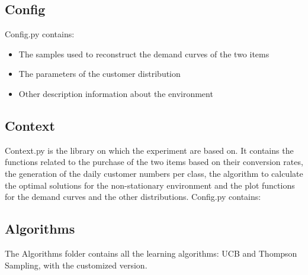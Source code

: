 \subsection*{Config}
Config.py contains:
\begin{itemize}
	\item The samples used to reconstruct the demand curves of the two items
	\item The parameters of the customer distribution
	\item Other description information about the environment
\end{itemize} 

\subsection*{Context}
Context.py is the library on which the experiment are based on. It contains the functions related to the purchase of the two items based on their conversion rates, the generation of the daily customer numbers per class, the algorithm to calculate the optimal solutions for the non-stationary environment and the plot functions for the demand curves and the other distributions.
Config.py contains:

\subsection*{Algorithms}
The Algorithms folder contains all the learning algorithms: UCB and Thompson Sampling, with the customized version.